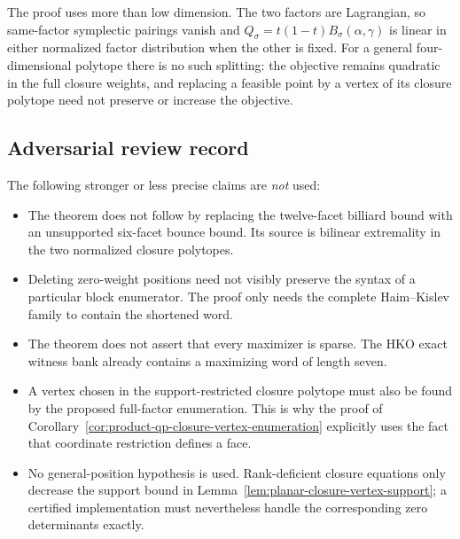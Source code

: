 \begin{remark}
The proof uses more than low dimension.  The two factors are Lagrangian, so
same-factor symplectic pairings vanish and
\(Q_\sigma=t(1-t)B_\sigma(\alpha,\gamma)\) is linear in either normalized
factor distribution when the other is fixed.  For a general four-dimensional
polytope there is no such splitting: the objective remains quadratic in the
full closure weights, and replacing a feasible point by a vertex of its
closure polytope need not preserve or increase the objective.
\end{remark}

\subsection{Adversarial review record}
\label{subsec:product-qp-six-facet-adversarial-review}

The following stronger or less precise claims are \emph{not} used:
\begin{itemize}
  \item The theorem does not follow by replacing the twelve-facet billiard
    bound with an unsupported six-facet bounce bound.  Its source is bilinear
    extremality in the two normalized closure polytopes.
  \item Deleting zero-weight positions need not visibly preserve the syntax of
    a particular block enumerator.  The proof only needs the complete
    Haim--Kislev family to contain the shortened word.
  \item The theorem does not assert that every maximizer is sparse.  The HKO
    exact witness bank already contains a maximizing word of length seven.
  \item A vertex chosen in the support-restricted closure polytope must also be
    found by the proposed full-factor enumeration.  This is why the proof of
    Corollary~\ref{cor:product-qp-closure-vertex-enumeration} explicitly uses
    the fact that coordinate restriction defines a face.
  \item No general-position hypothesis is used.  Rank-deficient closure
    equations only decrease the support bound in
    Lemma~\ref{lem:planar-closure-vertex-support}; a certified implementation
    must nevertheless handle the corresponding zero determinants exactly.
\end{itemize}
